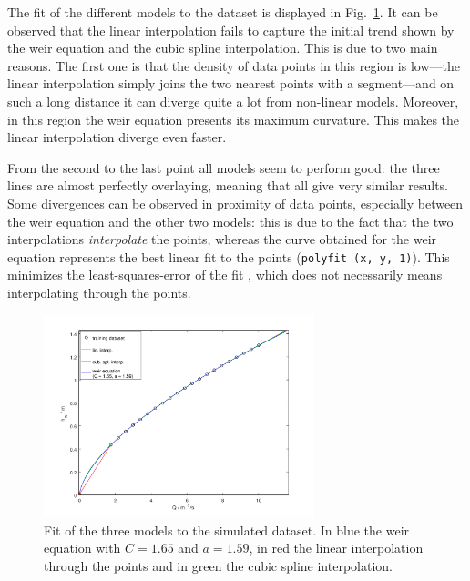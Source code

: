 The fit of the different models to the dataset is displayed in Fig.~\ref{fig:fitting_results}.
It can be observed that the linear interpolation fails to capture the initial trend shown by the weir equation and the cubic spline interpolation.
This is due to two main reasons.
The first one is that the density of data points in this region is low---the linear interpolation simply joins the two nearest points with a segment---and on such a long distance it can diverge quite a lot from non-linear models.
Moreover, in this region the weir equation presents its maximum curvature.
This makes the linear interpolation diverge even faster.

From the second to the last point all models seem to perform good: the three lines are almost perfectly overlaying, meaning that all give very similar results.
Some divergences can be observed in proximity of data points, especially between the weir equation and the other two models: this is due to the fact that the two interpolations \emph{interpolate} the points, whereas the curve obtained for the weir equation represents the best linear fit to the points (\texttt{polyfit (x, y, 1)}).
This minimizes the least-squares-error of the fit \autocite{eaton_gnu_2016}, which does not necessarily means interpolating through the points.

\begin{figure}[h]
  \centering
  \includegraphics[width=0.7\textwidth]{Figures/fitting_results.png}
  \caption{Fit of the three models to the simulated dataset. In blue the weir equation with $C = \num{1.65}$ and $a = \num{1.59}$, in red the linear interpolation through the points and in green the cubic spline interpolation.}
  \label{fig:fitting_results}
\end{figure}

